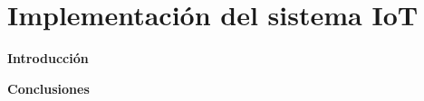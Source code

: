 \chapter{Implementación del sistema IoT}\label{cap: }

        \textbf{\Large Introducción}\newline

        \textbf{\Large Conclusiones}\newline

